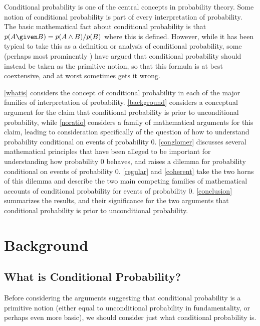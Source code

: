 Conditional probability is one of the central concepts in probability theory. Some notion of conditional probability is part of every interpretation of probability. The basic mathematical fact about conditional probability is that $p(A \given B)=p(A\land B)/p(B)$ where this is defined. However, while it has been typical to take this as a definition or analysis of conditional probability, some (perhaps most prominently \citealp{wcpcnb}) have argued that conditional probability should instead be taken as the primitive notion, so that this formula is at best coextensive, and at worst sometimes gets it wrong.

\autoref{whatis} considers the concept of conditional probability in each of the major families of interpretation of probability. \autoref{background} considers a conceptual argument for the claim that conditional probability is prior to unconditional probability, while \autoref{noratio} considers a family of mathematical arguments for this claim, leading to consideration specifically of the question of how to understand probability conditional on events of probability $0$. \autoref{conglomer} discusses several mathematical principles that have been alleged to be important for understanding how probability $0$ behaves, and raises a dilemma for probability conditional on events of probability $0$. \autoref{regular} and \autoref{coherent} take the two horns of this dilemma and describe the two main competing families of mathematical accounts of conditional probability for events of probability $0$. \autoref{conclusion} summarizes the results, and their significance for the two arguments that conditional probability is prior to unconditional probability.


\section{Background}

\subsection{What is Conditional Probability?}\label{whatis}

Before considering the arguments suggesting that conditional probability is a primitive notion (either equal to unconditional probability in fundamentality, or perhaps even more basic), we should consider just what conditional probability is.

